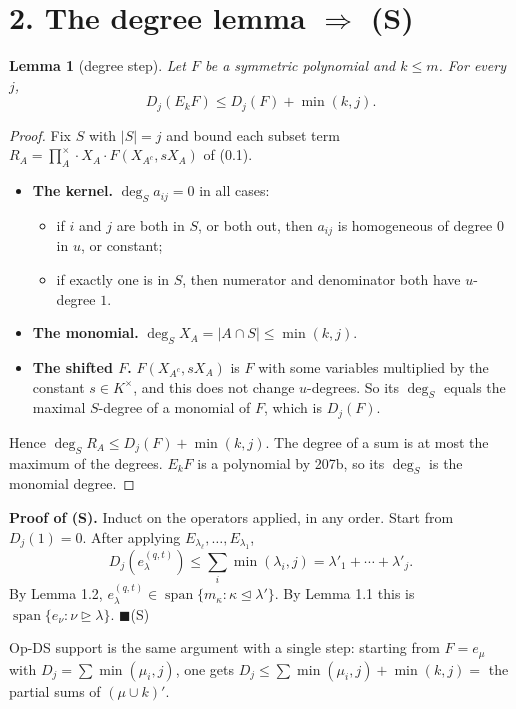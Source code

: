 \documentclass[11pt]{article}
\newtheorem{genericlemma}{Lemma}
\newenvironment{lem}[1]{\renewcommand{\thegenericlemma}{#1}\begin{genericlemma}}{\end{genericlemma}}
\theoremstyle{definition}
\newcommand{\prodx}{\textstyle\prod^{\times}}
\newcommand{\dom}{\trianglerighteq}
\newcommand{\domd}{\trianglelefteq}
\begin{document}
\section*{2. The degree lemma $\Rightarrow$ (S)}

\begin{lem}{2.1}[degree step]
Let $F$ be a symmetric polynomial and $k \le m$. For every $j$,
\[
D_j(E_kF) \le D_j(F) + \min(k, j).
\]
\end{lem}

\begin{proof}
Fix $S$ with $|S| = j$ and bound each subset term $R_A = \prodx_A \cdot X_A \cdot F(X_{A^c}, sX_A)$ of (0.1).
\begin{itemize}
\item \textbf{The kernel.} $\deg_S a_{ij} = 0$ in all cases:
 \begin{itemize}
 \item if $i$ and $j$ are both in $S$, or both out, then $a_{ij}$ is homogeneous of degree $0$ in $u$, or constant;
 \item if exactly one is in $S$, then numerator and denominator both have $u$-degree $1$.
 \end{itemize}
\item \textbf{The monomial.} $\deg_S X_A = |A \cap S| \le \min(k, j)$.
\item \textbf{The shifted $F$.} $F(X_{A^c}, sX_A)$ is $F$ with some variables multiplied by the constant $s \in K^\times$, and this does not change $u$-degrees. So its $\deg_S$ equals the maximal $S$-degree of a monomial of $F$, which is $D_j(F)$.
\end{itemize}
Hence $\deg_S R_A \le D_j(F) + \min(k, j)$. The degree of a sum is at most the maximum of the degrees. $E_kF$ is a polynomial by 207b, so its $\deg_S$ is the monomial degree.
\end{proof}

\noindent\textbf{Proof of (S).} Induct on the operators applied, in any order. Start from $D_j(1) = 0$. After applying $E_{\lambda_\ell}, \ldots, E_{\lambda_1}$,
\[
D_j(e_\lambda^{(q,t)}) \le \sum_i \min(\lambda_i, j) = \lambda'_1 + \cdots + \lambda'_j.
\]
By Lemma 1.2, $e_\lambda^{(q,t)} \in \operatorname{span}\{m_\kappa : \kappa \domd \lambda'\}$. By Lemma 1.1 this is $\operatorname{span}\{e_\nu : \nu \dom \lambda\}$. \hfill$\blacksquare$(S)

\smallskip
Op-DS support is the same argument with a single step: starting from $F = e_\mu$ with $D_j = \sum \min(\mu_i, j)$, one gets $D_j \le \sum \min(\mu_i, j) + \min(k, j) =$ the partial sums of $(\mu\cup k)'$.
\end{document}
